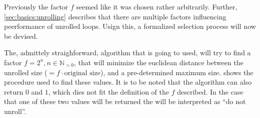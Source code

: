 Previously the factor $f$ seemed like it was chosen rather arbitrarily.
Further, \cref{sec:basics:unrolling} describes that there are multiple factors influencing peerformance of unrolled loops.
Usign this, a formalized selection process will now be devised.

The, admittely straighforward, algorithm that is going to used, will try to find a factor $f = 2^n, n \in \mathbb{N}_{>0}$, that will minimize the euclidean distance between the unrolled size ($= f \cdot \text{original size}$), and a pre-determined maximum size.
 shows the procedure used to find these values.
It is to be noted that the algorithm can also return $0$ and $1$, which dies not fit the definition of the $f$ described.
In the case that one of these two values will be returned the will be interpreted as ``do not unroll''.

